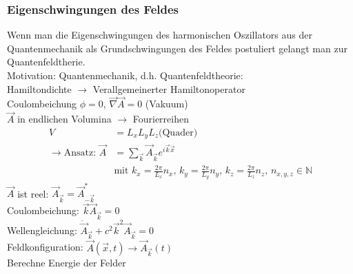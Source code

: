 \documentclass[a4paper]{article}
\begin{document}
\subsubsection{Eigenschwingungen des Feldes}
Wenn man die Eigenschwingungen des harmonischen Oszillators aus der
Quantenmechanik als Grundschwingungen des Feldes postuliert gelangt man zur
Quantenfeldtherie. \\
Motivation: Quantenmechanik, d.h. Quantenfeldtheorie:\\
Hamiltondichte $\rightarrow$ Verallgemeinerter Hamiltonoperator\\
Coulombeichung $\phi=0$, $\vec{\nabla}\vec{A}=0$ (Vakuum)\\
$\vec{A}$ in endlichen Volumina $\rightarrow$ Fourierreihen\\
\begin{align}
V&=L_xL_yL_z \text{(Quader)}\\
\rightarrow \text{Ansatz: }
\vec{A}&=\sum_{\vec{k}}\vec{A}_{\vec{k}} e^{i \vec{k} \vec{x}}\\
&\text{mit } k_x=\frac{2\pi}{L_x}n_x \text{, } k_y=\frac{2\pi}{L_y}n_y \text{,
 }
k_z=\frac{2\pi}{L_z}n_z \text{, } n_{x,y,z}\in\mathbb{N}
\end{align}
$\vec{A}$ ist reel: $\vec{A}_{\vec{k}}=\vec{A}^*_{-\vec{k}}$\\
Coulombeichung: $\vec{k}\vec{A}_{\vec{k}}=0$\\
Wellengleichung: $\ddot{\vec{A}}_{\vec{k}}+c^2\vec{k}^2\vec{A}_{\vec{k}}=0$\\
Feldkonfiguration: $\vec{A}(\vec{x},t)\longrightarrow\vec{A}_{\vec{k}}(t)$\\
Berechne Energie der Felder
\end{document}
